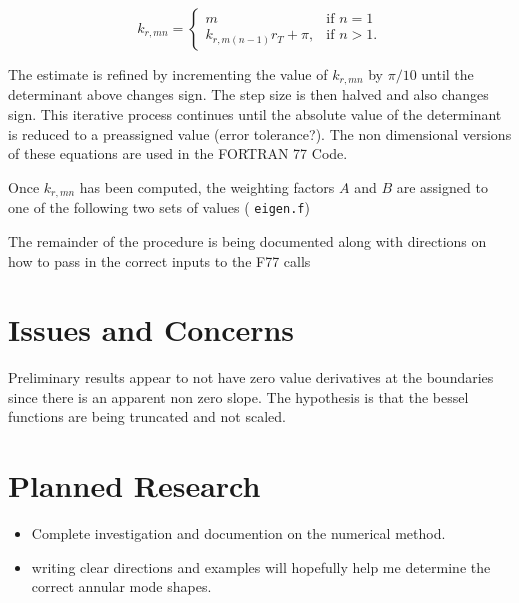 \documentclass[a4paper]{article}
\begin{document}
 \begin{equation}
     k_{r,mn} = 
    \begin{cases}
        m & \text{if } n = 1\\
        k_{r,m(n-1)} r_T + \pi,              & \text{if }  n > 1.
    \end{cases}
 \end{equation}

 The estimate is refined by incrementing the value of $k_{r,mn}$ by $\pi/10$ until
 the determinant above changes sign. The step size is then halved and also changes 
 sign. This iterative process continues until the absolute value of the determinant 
 is reduced to a preassigned value (error tolerance?). The non dimensional versions
 of these equations are used in the FORTRAN 77 Code.

 Once $k_{r,mn}$ has been computed, the weighting factors $A$ and $B$ are assigned to 
 one of the following two sets of values ( \verb|eigen.f|)


 The remainder of the procedure is being documented along with directions on 
 how to pass in the correct inputs to the F77 calls
  
\section{Issues and Concerns}
Preliminary results appear to not have zero value derivatives at the boundaries
since there is an apparent non zero slope. The hypothesis is that the 
bessel functions are being truncated and not scaled. 

\section{Planned Research}
\begin{itemize}
    \item Complete investigation and documention on the numerical method.
    \item writing clear directions and examples will hopefully help me determine the 
        correct annular mode shapes.
\end{itemize}
\end{document}
